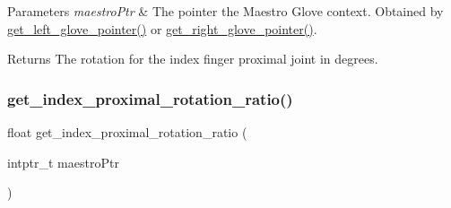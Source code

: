 \begin{DoxyParams}{Parameters}
{\em maestro\+Ptr} & The pointer the Maestro Glove context. Obtained by \hyperlink{group__glove_management_ga63ce3c99d4a8b8db851b22af9185764e}{get\+\_\+left\+\_\+glove\+\_\+pointer()} or \hyperlink{group__glove_management_ga9b8fd9d91aeac3f8da50f7a7eba0c32b}{get\+\_\+right\+\_\+glove\+\_\+pointer()}. \\
\hline
\end{DoxyParams}
\begin{DoxyReturn}{Returns}
The rotation for the index finger proximal joint in degrees. 
\end{DoxyReturn}
\mbox{\label{group__rotation_access_ga2b6d18c3684d7f0759ebae5201edc666}} 
\subsubsection{\texorpdfstring{get\+\_\+index\+\_\+proximal\+\_\+rotation\+\_\+ratio()}{get\_index\_proximal\_rotation\_ratio()}}
{\footnotesize\ttfamily float get\+\_\+index\+\_\+proximal\+\_\+rotation\+\_\+ratio (\begin{DoxyParamCaption}\item[{intptr\+\_\+t}]{maestro\+Ptr }\end{DoxyParamCaption})}


